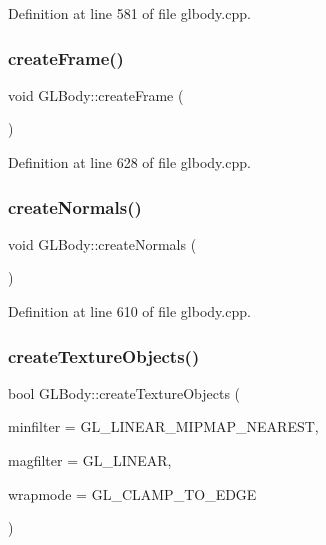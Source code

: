 Definition at line 581 of file glbody.\+cpp.

\mbox{\label{class_g_l_body_aac288828b1d2eb46f1e6750a696d557f}} 
\subsubsection{\texorpdfstring{createFrame()}{createFrame()}}
{\footnotesize\ttfamily void G\+L\+Body\+::create\+Frame (\begin{DoxyParamCaption}{ }\end{DoxyParamCaption})\hspace{0.3cm}{\ttfamily [protected]}}



Definition at line 628 of file glbody.\+cpp.

\mbox{\label{class_g_l_body_ae306a6519ac1ad0903386ce9b9c511c5}} 
\subsubsection{\texorpdfstring{createNormals()}{createNormals()}}
{\footnotesize\ttfamily void G\+L\+Body\+::create\+Normals (\begin{DoxyParamCaption}{ }\end{DoxyParamCaption})\hspace{0.3cm}{\ttfamily [protected]}}



Definition at line 610 of file glbody.\+cpp.

\mbox{\label{class_g_l_body_a760a4221bb18ac880c10c41984e4257b}} 
\subsubsection{\texorpdfstring{createTextureObjects()}{createTextureObjects()}}
{\footnotesize\ttfamily bool G\+L\+Body\+::create\+Texture\+Objects (\begin{DoxyParamCaption}\item[{G\+Lenum}]{minfilter = {\ttfamily GL\+\_\+LINEAR\+\_\+MIPMAP\+\_\+NEAREST},  }\item[{G\+Lenum}]{magfilter = {\ttfamily GL\+\_\+LINEAR},  }\item[{G\+Lenum}]{wrapmode = {\ttfamily GL\+\_\+CLAMP\+\_\+TO\+\_\+EDGE} }\end{DoxyParamCaption})}


